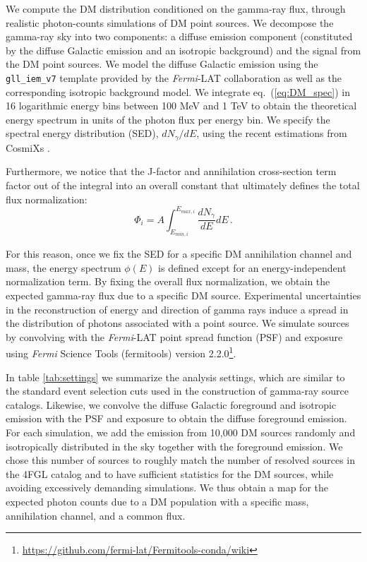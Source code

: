 \documentclass[12pt, a4paper]{article}
\newcommand{\Fermi}{\textsl{Fermi}}
\begin{document}
We compute the DM distribution  conditioned on the gamma-ray flux, through realistic photon-counts simulations of DM point sources. 
We decompose the gamma-ray sky into two  components: a diffuse emission component (constituted by the diffuse Galactic emission and an isotropic background) and the signal from the DM point sources. 
We model the diffuse Galactic emission using the \verb|gll_iem_v7| template provided by the \Fermi-LAT collaboration as well as the corresponding isotropic background model.
We integrate eq.~(\ref{eq:DM_spec}) in 16 logarithmic energy bins between 100 MeV and 1 TeV to obtain the theoretical energy spectrum in units of the photon flux per energy bin.
We specify the spectral energy distribution (SED), $dN_\gamma/dE$, using the recent estimations from CosmiXs \cite{Arina:2023eic}.

Furthermore, we notice that the J-factor and annihilation cross-section term factor out of the integral into an overall constant that ultimately defines the total flux normalization: 
\begin{equation}
   \Phi_i = A \int_{E_{min, i}}^{E_{max,i} }\frac{dN_\gamma}{dE}dE \,.
\end{equation}

For this reason, once we fix the SED for a specific DM annihilation channel and mass, the energy spectrum $\phi(E)$ is defined except for an energy-independent normalization term. 
By fixing the overall flux normalization, we obtain the expected gamma-ray flux due to a specific DM source. 
Experimental uncertainties in the reconstruction of energy and direction of gamma rays induce a spread in the distribution of photons associated with a point source.
We simulate sources by convolving with the \Fermi-LAT point spread function (PSF) and exposure
using {\Fermi} Science Tools (fermitools) version 2.2.0\footnote{\url{https://github.com/fermi-lat/Fermitools-conda/wiki}}.

In table \ref{tab:settings} we summarize the analysis settings, which are similar to the standard event selection cuts used in the construction of gamma-ray source catalogs. 
Likewise, we convolve the diffuse Galactic foreground and isotropic emission with the PSF and exposure to obtain the diffuse foreground emission.
For each simulation, we add the emission from 10,000 DM sources randomly and isotropically distributed in the sky together with the foreground emission. We chose this number of sources to roughly match the number of resolved sources in the 4FGL catalog and to have sufficient statistics for the DM sources, while avoiding excessively demanding simulations. We thus obtain a map for the expected photon counts due to a DM population with a specific mass, annihilation channel, and a common flux.
\end{document}
